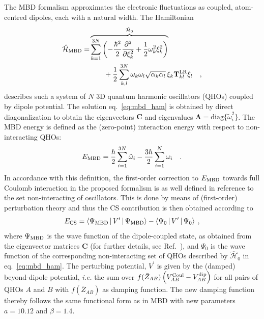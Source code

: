 \documentclass[aps,prl,groupaddress, twocolumn]{revtex4-1}  %
\begin{document}
The MBD formalism approximates the electronic fluctuations as coupled, atom-centred dipoles, each with a natural width. The Hamiltonian
\begin{equation}\label{eq:mbd_ham}
\begin{split}
\hat{\mathcal{H}}_{\mathrm{MBD}} = &\overbrace{\sum_{k=1}^{3N} \left( -\frac{\hbar^2}{2}\frac{\partial^2}{\partial \xi_{k}^2} + \frac{1}{2}\omega_k^2  \xi_k^2\right) }^{\hat{\mathcal{H}}_0}\\
& \qquad + \frac{1}{2}\sum_{k,l}^{3N} \omega_k\omega_l\sqrt{\alpha_k \alpha_l}\,\xi_k \mathbf{T}_{kl}^{\rm LR} \xi_l \quad,
\end{split}
\end{equation}
describes such a system of $N$ 3D quantum harmonic oscillators (QHOs) coupled by dipole potential. The solution eq.~\eqref{eq:mbd_ham} is obtained by direct diagonalization to obtain the eigenvectors $\mathbf{C}$ and eigenvalues $\mathbf{\Lambda} = \mathrm{diag}\{\tilde{\omega}_i^2\}$. The MBD energy is defined as the (zero-point) interaction energy with respect to non-interacting QHOs:
 \begin{eqnarray}
 E_{\rm MBD}
=\frac{\hbar}{2}\sum_{i=1}^{3N}\tilde{\omega}_i - \frac{3\hbar}{2}\sum_{i=1}^{N}\omega_i \quad . \label{eq:mbd_en}
 \end{eqnarray}
 In accordance with this definition, the first-order correction to $E_{\rm MBD}$ towards full Coulomb interaction in the proposed formalism is as well defined in reference to the set non-interacting of oscillators. This is done by means of (first-order) perturbation theory and thus the CS contribution is then obtained according to
 \begin{equation}\label{foc_energy_damp}
E_{\rm CS} = \Braket{\Psi_{\rm MBD} | V^\prime | \Psi_{\rm MBD}} - \Braket{\Psi_0 | V^\prime | \Psi_0} \:,
\end{equation}
where $\Psi_{\rm MBD}$ is the wave function of the dipole-coupled state, as obtained from the eigenvector matrices $\mathbf{C}$ (for further details, see Ref.~\cite{hermann_ncomm2017}), and $\Psi_0$ is the wave function of the corresponding non-interacting set of QHOs described by $\hat{\mathcal{H}}_0$ in eq.~\eqref{eq:mbd_ham}. The perturbing potential, $V^\prime$ is given by the (damped) beyond-dipole potential, \textit{i.e.} the sum over $f(\bar{Z}_{AB})\left(V_{AB}^{\rm Coul}-V_{AB}^{\rm dip}\right)$ for all pairs of QHOs $A$ and $B$ with $f(\bar{Z}_{AB})$ as damping function. The new damping function thereby follows the same functional form as in MBD with new parameters $a=10.12$ and $\beta=1.4$.
\end{document}
